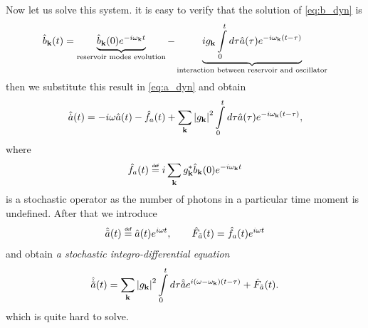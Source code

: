 Now let us solve this system. it is easy to verify that the solution of  \eqref{eq:b_dyn}  is
\begin{equation}
	\hat{b}_{\mathbf{k}}(t) = \underbrace{\hat{b}_{\mathbf{k}}(0) e^{-i\omega_{\mathbf{k}} t}}_{\text{reservoir modes evolution}} - \underbrace{i g_{\mathbf{k}} \int \limits_0^{t} d\tau \hat{a}(\tau) e^{-i\omega_{\mathbf{k}}(t - \tau)}}_{\text{interaction between reservoir and oscillator}}
\end{equation}
then we substitute this result in \eqref{eq:a_dyn} and obtain
\begin{equation}
	\hat{\dot{a}}(t) = - i \omega \hat{a}(t) - \hat{f}_a(t) + \sum_{\mathbf{k}} \left| g_{\mathbf{k}} \right|^2 \int \limits_0^td\tau \hat{a}(\tau) e^{-i\omega_{\mathbf{k}}(t - \tau)},
\end{equation}
where
\begin{equation}
	\hat{f}_a(t) \myeq i \sum_{\kv} g_{\kv}^* \hat{b}_{\kv}(0) e^{-i\omega_{\kv} t}
\end{equation}
is a stochastic operator as the number of photons in a particular time moment is undefined. After that we introduce 
\begin{equation}
	\hat{\tilde{a}}(t) \myeq \hat{a}(t) e^{i \omega t}, \qquad \hat{F}_{\tilde{a}} (t) = \hat{f}_a(t) e^{i \omega t}
\end{equation}
and obtain \textit{a stochastic integro-differential equation} 
\begin{equation}
	\hat{\dot{\tilde{a}}}(t) = \sum_{\mathbf{k}} \left| g_{\mathbf{k}} \right|^2 \int \limits_0^t d\tau \hat{\tilde{a}} e^{i(\omega-\omega_{\mathbf{k}})(t - \tau)} + \hat{F}_{\tilde{a}} (t).
	\label{eq:st_int_dif}
\end{equation}
which is quite hard to solve.

